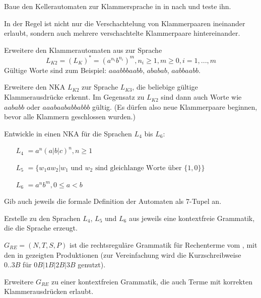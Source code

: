 \documentclass[fontsize=10pt, a4paper, ngerman]{scrartcl}
\begin{document}
\newpage

\begin{aufgabe}
\label{aufg:nka-klammern}
Baue den Kellerautomaten zur Klammersprache in
 in  nach und teste ihn.
\end{aufgabe}

\begin{aufgabe}
\label{aufg:nka-klammern2}
In der Regel ist nicht nur die Verschachtelung von Klammerpaaren
ineinander erlaubt, sondern auch mehrere verschachtelte Klammerpaare
hintereinander.

\begin{enuma}
	\item
	Erweitere den Klammerautomaten aus 
	zur Sprache
	\[ L_{K2} = (L_K)^{*} = (a^{n_i}b^{n_i})^{m}, n_i\geq 1, m\geq 0, i = 1,...,m \]
	Gültige Worte sind zum Beispiel: $aaabbbaabb$, $ababab$, $aabbaabb$.

	\item
	Erweitere den NKA $L_{K2}$ zur Sprache $L_{K3}$, die beliebige
	gültige Klammerausdrücke erkennt. Im Gegensatz zu $L_{K2}$ sind
	dann auch Worte wie $aababb$ oder $aaabaababbabbb$ gültig.
	(Es dürfen also neue Klammerpaare beginnen, bevor alle Klammern
	geschlossen wurden.)
\end{enuma}
\end{aufgabe}

\begin{aufgabe}
\label{aufg:nka-uebungen}
Entwickle in  einen NKA für die Sprachen $L_4$ bis $L_6$:

\begin{itemize}
	\item[$L_4$]$ = a^n(a|b|c)^n, n \geq 1$
	\item[$L_5$]$ = \{ w_1 a w_2 | w_1\text{ und }w_2\text{ sind gleichlange Worte über }\{1,0\} \}$
	\item[$L_6$]$ = a^nb^m, 0 \leq a < b$
\end{itemize}

Gib auch jeweils die formale Definition der Automaten als 7-Tupel an.
\end{aufgabe}

\begin{aufgabe}
\label{aufg:grammatik-uebungen}
Erstelle zu den Sprachen $L_4$, $L_5$ und $L_6$ aus
 jeweils eine kontextfreie Grammatik,
die die Sprache erzeugt.
\end{aufgabe}

\begin{aufgabe}
\label{aufg:grammatik-rechenterme}
$G_{RE} = (N,T,S,P)$ ist die rechtsreguläre Grammatik für Rechenterme
vom , mit den in 
gezeigten Produktionen (zur Vereinfachung wird die Kurzschreibweise
$0..3 B$ für $0B|1B|2B|3B$ genutzt).

Erweitere $G_{RE}$ zu einer kontextfreien Grammatik, die auch Terme mit
korrekten Klammerausdrücken erlaubt.
\end{aufgabe}
\end{document}
